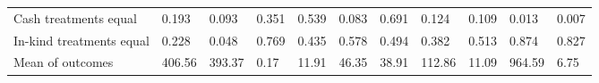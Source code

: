 \documentclass{report}
\begin{document}
\begin{table}[H]
{\begin{tabular}{lllllllllll}
\hspace{1em}\hspace{1em} Cash treatments equal & 0.193 & 0.093 & 0.351 & 0.539 & 0.083 & 0.691 & 0.124 & 0.109 & 0.013 & 0.007\\
\hspace{1em}\hspace{1em} In-kind treatments equal & 0.228 & 0.048 & 0.769 & 0.435 & 0.578 & 0.494 & 0.382 & 0.513 & 0.874 & 0.827\\
\hspace{1em}Mean of outcomes & 406.56 & 393.37 & 0.17 & 11.91 & 46.35 & 38.91 & 112.86 & 11.09 & 964.59 & 6.75\\
\bottomrule
\end{tabular}}
\end{table}
\end{document}
